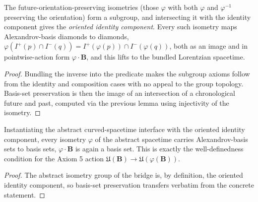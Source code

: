 \begin{lemma}
    \label{lmm:isometry-preserves-basis-sets}
    \leanok
    The future-orientation-preserving isometries (those $\varphi$ with both $\varphi$ and $\varphi^{-1}$ preserving the orientation) form a subgroup, and intersecting it with the identity component gives the \emph{oriented identity component}. Every such isometry maps Alexandrov-basis diamonds to diamonds, $\varphi(I^+(p) \cap I^-(q)) = I^+(\varphi(p)) \cap I^-(\varphi(q))$, both as an image and in pointwise-action form $\varphi \cdot \mathbf{B}$, and this lifts to the bundled Lorentzian spacetime.
\end{lemma}
\begin{proof}
    \leanok
    Bundling the inverse into the predicate makes the subgroup axioms follow from the identity and composition cases with no appeal to the group topology. Basis-set preservation is then the image of an intersection of a chronological future and past, computed via the previous lemma using injectivity of the isometry.
\end{proof}

\begin{lemma}
    \label{lmm:axiom5-basis-preservation}
    \leanok
    Instantiating the abstract curved-spacetime interface with the oriented identity component, every isometry $\varphi$ of the abstract spacetime carries Alexandrov-basis sets to basis sets, $\varphi \cdot \mathbf{B}$ is again a basis set. This is exactly the well-definedness condition for the Axiom 5 action $\mathfrak{U}(\mathbf{B}) \to \mathfrak{U}(\varphi(\mathbf{B}))$.
\end{lemma}
\begin{proof}
    \leanok
    The abstract isometry group of the bridge is, by definition, the oriented identity component, so basis-set preservation transfers verbatim from the concrete statement.
\end{proof}

